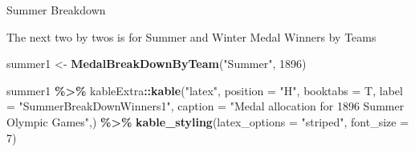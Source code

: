 \documentclass[
]{article}
\newenvironment{Shaded}{\begin{snugshade}}{\end{snugshade}}
\newcommand{\AttributeTok}[1]{\textcolor[rgb]{0.13,0.29,0.53}{#1}}
\newcommand{\DecValTok}[1]{\textcolor[rgb]{0.00,0.00,0.81}{#1}}
\newcommand{\FunctionTok}[1]{\textcolor[rgb]{0.13,0.29,0.53}{\textbf{#1}}}
\newcommand{\NormalTok}[1]{#1}
\newcommand{\OtherTok}[1]{\textcolor[rgb]{0.56,0.35,0.01}{#1}}
\newcommand{\SpecialCharTok}[1]{\textcolor[rgb]{0.81,0.36,0.00}{\textbf{#1}}}
\newcommand{\StringTok}[1]{\textcolor[rgb]{0.31,0.60,0.02}{#1}}
\begin{document}
\newpage

Summer Breakdown

The next two by twos is for Summer and Winter Medal Winners by Teams

\begin{Shaded}
\begin{Highlighting}[]
\NormalTok{summer1 }\OtherTok{\textless{}{-}} \FunctionTok{MedalBreakDownByTeam}\NormalTok{(}\StringTok{"Summer"}\NormalTok{, }\DecValTok{1896}\NormalTok{)}

\NormalTok{summer1 }\SpecialCharTok{\%\textgreater{}\%} 
\NormalTok{  kableExtra}\SpecialCharTok{::}\FunctionTok{kable}\NormalTok{(}\StringTok{"latex"}\NormalTok{, }\AttributeTok{position =} \StringTok{"H"}\NormalTok{,  }\AttributeTok{booktabs =}\NormalTok{ T,}
         \AttributeTok{label =} \StringTok{"SummerBreakDownWinners1"}\NormalTok{,}
         \AttributeTok{caption =} \StringTok{"Medal allocation for 1896 Summer Olympic Games"}\NormalTok{,) }\SpecialCharTok{\%\textgreater{}\%} 
         \FunctionTok{kable\_styling}\NormalTok{(}\AttributeTok{latex\_options =} \StringTok{"striped"}\NormalTok{, }\AttributeTok{font\_size =} \DecValTok{7}\NormalTok{)}
\end{Highlighting}
\end{Shaded}
\end{document}
